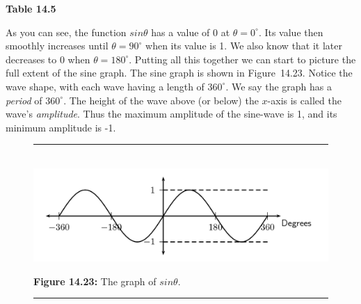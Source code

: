 {\begin{center}
\begin{xtabular*}{\mytablewidth}[t]{|p{10\mystarwidth}|p{10\mystarwidth}|p{10\mystarwidth}|p{10\mystarwidth}|p{10\mystarwidth}|p{10\mystarwidth}|p{10\mystarwidth}|}
     \tabularnewline{}
    \end{xtabular*}
      \end{center}
    \begin{center}{\small\bfseries Table 14.5}\end{center}
        }%
    \par
        \label{m39414*id84327}As you can see, the function $sin\theta $ has a value of 0 at $\theta ={0}^{\circ }$. Its value then smoothly increases until $\theta ={90}^{\circ }$ when its value is 1. We also know that it later decreases to 0 when $\theta ={180}^{\circ }$. Putting all this together we can start to picture the full extent of the sine graph. The sine graph is shown in Figure~14.23. Notice the wave shape, with each wave having a length of ${360}^{\circ }$. We say the graph has a \textsl{period} of ${360}^{\circ }$. The height of the wave above (or below) the $x$-axis is called the wave's \textsl{amplitude}. Thus the maximum amplitude of the sine-wave is 1, and its minimum amplitude is -1.\par 
    \setcounter{subfigure}{0}
	\begin{figure}[H] %
    \begin{center}
    \rule[.1in]{\figurerulewidth}{.005in} \\
        \label{m39414*uid31!!!underscore!!!media}\label{m39414*uid31!!!underscore!!!printimage}\includegraphics{col11306.imgs/m39414_MG10C15_017.png} %
      \vspace{2pt}
    \vspace{\rubberspace}\par \begin{cnxcaption}
	  \small \textbf{Figure 14.23: }The graph of $sin\theta $.
	\end{cnxcaption}
    \vspace{.1in}
    \rule[.1in]{\figurerulewidth}{.005in} \\
    \end{center}
 \end{figure}       
      \label{m39414*uid32}

